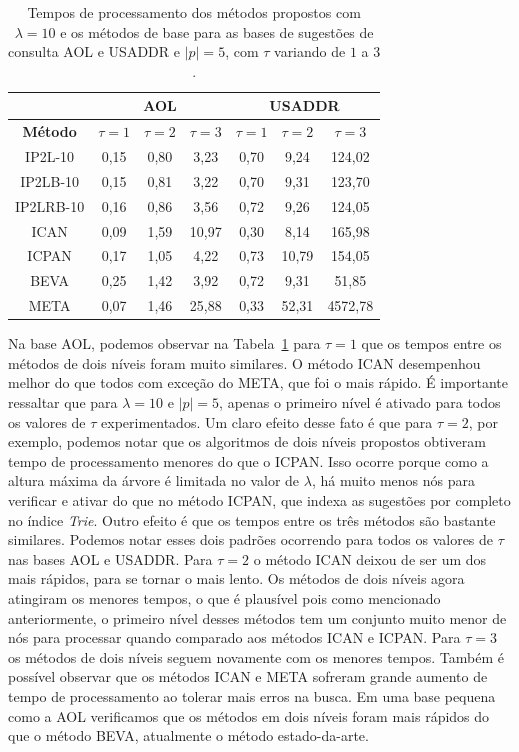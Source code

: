 \begin{table}[h]
\centering
\begin{tabular}{c|c|c|c|c|c|c|}
\cline{2-7}
\multicolumn{1}{l|}{} & \multicolumn{3}{c|}{\textbf{AOL}} & \multicolumn{3}{c|}{\textbf{USADDR}} \\ \hline
\multicolumn{1}{|c|}{\textbf{Método}} & $\tau=1$ & $\tau=2$ & $\tau=3$ & $\tau=1$ & $\tau=2$ & $\tau=3$ \\ \hline
\multicolumn{1}{|c|}{IP2L-10} & 0,15 & 0,80 & 3,23 & 0,70 & 9,24 & 124,02 \\ \hline
\multicolumn{1}{|c|}{IP2LB-10} & 0,15 & 0,81 & 3,22 & 0,70 & 9,31 & 123,70 \\ \hline
\multicolumn{1}{|c|}{IP2LRB-10} & 0,16 & 0,86 & 3,56 & 0,72 & 9,26 & 124,05 \\ \hline
\multicolumn{1}{|c|}{ICAN} & 0,09 & 1,59 & 10,97 & 0,30 & 8,14 & 165,98 \\ \hline
\multicolumn{1}{|c|}{ICPAN} & 0,17 & 1,05 & 4,22 & 0,73 & 10,79 & 154,05 \\ \hline
\multicolumn{1}{|c|}{BEVA} & 0,25 & 1,42 & 3,92 & 0,72 & 9,31 & 51,85 \\ \hline
\multicolumn{1}{|c|}{META} & 0,07 & 1,46 & 25,88 & 0,33 & 52,31 & 4572,78 \\ \hline
\end{tabular}
\caption{Tempos de processamento dos métodos propostos com $\lambda=10$ e os métodos de base para as bases de sugestões de consulta AOL e USADDR e $|p|=5$, com $\tau$ variando de $1$ a $3$.}
\label{tab:baselines-varying-tau-p-5}
\end{table}

Na base AOL, podemos observar na Tabela~\ref{tab:baselines-varying-tau-p-5} para $\tau=1$ que os tempos entre os métodos de dois níveis foram muito similares. O método ICAN desempenhou melhor do que todos com exceção do META, que foi o mais rápido. É importante ressaltar que para $\lambda=10$ e $|p|=5$, apenas o primeiro nível é ativado para todos os valores de $\tau$ experimentados. Um claro efeito desse fato é que para $\tau=2$, por exemplo, podemos notar que os algoritmos de dois níveis propostos obtiveram tempo de processamento menores do que o ICPAN. Isso ocorre porque como a altura máxima da árvore é limitada no valor de $\lambda$, há muito menos nós para verificar e ativar do que no método ICPAN, que indexa as sugestões por completo no índice \textit{Trie}. Outro efeito é que os tempos entre os três métodos são bastante similares. Podemos notar esses dois padrões ocorrendo para todos os valores de $\tau$ nas bases AOL e USADDR. Para $\tau=2$ o método ICAN deixou de ser um dos mais rápidos, para se tornar o mais lento. Os métodos de dois níveis agora atingiram os menores tempos, o que é plausível pois como mencionado anteriormente, o primeiro nível desses métodos tem um conjunto muito menor de nós para processar quando comparado aos métodos ICAN e ICPAN. Para $\tau=3$ os métodos de dois níveis seguem novamente com os menores tempos. Também é possível observar que os métodos ICAN e META sofreram grande aumento de tempo de processamento ao tolerar mais erros na busca. Em uma base pequena como a AOL verificamos que os métodos em dois níveis foram mais rápidos do que o método BEVA, atualmente o método estado-da-arte.

